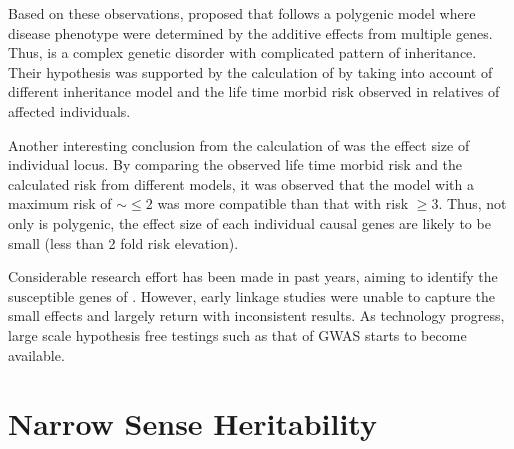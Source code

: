 \documentclass{book}
\newcommand*{\glng}{\glsentrylong}
\begin{document}
	Based on these observations, \cite{Gottesman1967} proposed that \glng{scz} follows a polygenic model where disease phenotype were determined by the additive effects from multiple genes.
	Thus, \glng{scz} is a complex genetic disorder with complicated pattern of inheritance. 
	Their hypothesis was supported by the calculation of \cite{Risch1990a} by taking into account of different inheritance model and the life time morbid risk observed in relatives of affected individuals.
	
	Another interesting conclusion from the calculation of \cite{Risch1990a} was the effect size of individual locus. 
	By comparing the observed life time morbid risk and the calculated risk from different models, it was observed that the model with a maximum risk of $\sim\le2$ was more compatible than that with risk $\ge3$.
	Thus, not only is \glng{scz} polygenic, the effect size of each individual causal genes are likely to be small (less than 2 fold risk elevation).

	Considerable research effort has been made in past years, aiming to identify the susceptible genes of \glng{scz}.
	However, early linkage studies were unable to capture the small effects and largely return with inconsistent results\citep{Harrison2005}. 
	As technology progress, large scale hypothesis free testings such as that of \gls{GWAS} starts to become available.
	
	
	\section{Narrow Sense Heritability}
	\subsection{\glng{gcta}}
	\subsection{\glng{ldsc}}
\end{document}
